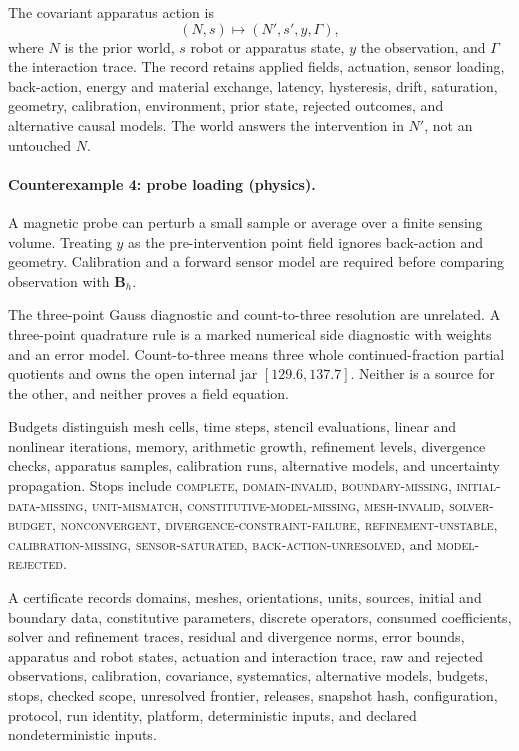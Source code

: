 The covariant apparatus action is
\[
                         (N,s)\longmapsto(N',s',y,\Gamma),
\]
where \(N\) is the prior world, \(s\) robot or apparatus state, \(y\) the observation, and \(\Gamma\) the interaction
trace.  The record retains applied fields, actuation, sensor loading, back-action, energy and material exchange,
latency, hysteresis, drift, saturation, geometry, calibration, environment, prior state, rejected outcomes, and
alternative causal models.  The world answers the intervention in \(N'\), not an untouched \(N\).

\paragraph{Counterexample 4: probe loading (physics).}
A magnetic probe can perturb a small sample or average over a finite sensing volume.  Treating \(y\) as the
pre-intervention point field ignores back-action and geometry.  Calibration and a forward sensor model are required
before comparing observation with \(\mathbf B_h\).

The three-point Gauss diagnostic and count-to-three resolution are unrelated.  A three-point quadrature rule is a
marked numerical side diagnostic with weights and an error model.  Count-to-three means three whole continued-fraction
partial quotients and owns the open internal jar \([129.6,137.7]\).  Neither is a source for the other, and neither
proves a field equation.

Budgets distinguish mesh cells, time steps, stencil evaluations, linear and nonlinear iterations, memory, arithmetic
growth, refinement levels, divergence checks, apparatus samples, calibration runs, alternative models, and uncertainty
propagation.  Stops include \textsc{complete}, \textsc{domain-invalid}, \textsc{boundary-missing},
\textsc{initial-data-missing}, \textsc{unit-mismatch}, \textsc{constitutive-model-missing},
\textsc{mesh-invalid}, \textsc{solver-budget}, \textsc{nonconvergent}, \textsc{divergence-constraint-failure},
\textsc{refinement-unstable}, \textsc{calibration-missing}, \textsc{sensor-saturated},
\textsc{back-action-unresolved}, and \textsc{model-rejected}.

A certificate records domains, meshes, orientations, units, sources, initial and boundary data, constitutive parameters,
discrete operators, consumed coefficients, solver and refinement traces, residual and divergence norms, error bounds,
apparatus and robot states, actuation and interaction trace, raw and rejected observations, calibration, covariance,
systematics, alternative models, budgets, stops, checked scope, unresolved frontier, releases, snapshot hash,
configuration, protocol, run identity, platform, deterministic inputs, and declared nondeterministic inputs.

